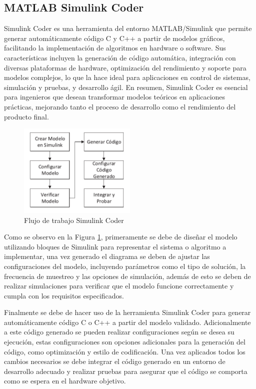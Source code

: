 \subsection{MATLAB Simulink Coder}

Simulink Coder es una herramienta del entorno MATLAB/Simulink que permite generar automáticamente código C y C++ a partir de modelos gráficos, facilitando la implementación de algoritmos en hardware o software. Sus características incluyen la generación de código automática, integración con diversas plataformas de hardware, optimización del rendimiento y soporte para modelos complejos, lo que la hace ideal para aplicaciones en control de sistemas, simulación y pruebas, y desarrollo ágil. En resumen, Simulink Coder es esencial para ingenieros que desean transformar modelos teóricos en aplicaciones prácticas, mejorando tanto el proceso de desarrollo como el rendimiento del producto final.
\newpage

\begin{figure}[h!]
    \centering
    \includegraphics[width=0.5\textwidth]{fig/teorico/Flujo de trabajo simulink coder.pdf}
    \caption{Flujo de trabajo Simulink Coder}
    \label{fig:Simulink_coder_workflow}
\end{figure}

Como se observo en la Figura \ref{fig:Simulink_coder_workflow}, primeramente se debe de diseñar el modelo utilizando bloques de Simulink para representar el sistema o algoritmo a implementar, una vez generado el diagrama se deben de ajustar las configuraciones del modelo, incluyendo parámetros como el tipo de solución, la frecuencia de muestreo y las opciones de simulación, además de esto se deben de realizar simulaciones para verificar que el modelo funcione correctamente y cumpla con los requisitos especificados. 

Finalmente se debe de hacer uso de la herramienta Simulink Coder para generar automáticamente código C o C++ a partir del modelo validado. Adicionalmente a este código generado se pueden realizar configuraciones según se desea su ejecución, estas configuraciones son opciones adicionales para la generación del código, como optimización y estilo de codificación. Una vez aplicados todos los cambios necesarios se debe integrar el código generado en un entorno de desarrollo adecuado y realizar pruebas para asegurar que el código se comporta como se espera en el hardware objetivo.

